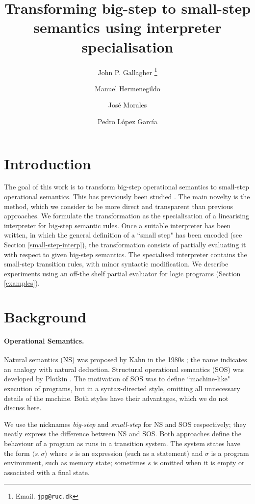 \documentclass{llncs}
\title{Transforming big-step to small-step semantics using interpreter specialisation}
\author{John P. Gallagher \thanks{Email. \texttt{jpg@ruc.dk}}\inst{1}\inst{2}
\and
Manuel Hermenegildo\inst{2}  \and Jos\'e Morales
\inst{2} \and Pedro L\'opez Garc\'ia\inst{2} 
}
\institute{Roskilde University, Denmark
\and
IMDEA Software Institute, Madrid, Spain}
\begin{document}
\maketitle


\pagestyle{plain}
\pagestyle{myheadings}

\section{Introduction}

The goal of this work is to transform big-step operational semantics to small-step operational semantics.
This has previously been studied \cite{VeselyF19,HuizingKK10,AmbalLSN22}.
The main novelty is the method, which we consider to be more
direct and transparent than previous approaches.  We formulate the transformation as the specialisation of a
linearising interpreter for big-step semantic rules.  Once a suitable interpreter has been written, in which the general
definition of a ``small step" has been encoded (see Section \ref{small-step-interp}), the transformation
consists of partially evaluating it with respect to given big-step semantics.  The specialised interpreter contains the 
small-step transition rules, 
with minor syntactic modification. We describe experiments using an off-the shelf partial evaluator 
for logic programs \cite{Logen} (Section \ref{examples}).
\section{Background}\label{background}

\paragraph{Operational Semantics.}
Natural semantics (NS) was proposed by Kahn in the 
1980s \cite{Kahn87}; the name indicates an analogy with natural deduction. 
Structural operational semantics (SOS) was developed by Plotkin \cite{Plotkin1981,Plotkin04,Plotkin04a}.  
The motivation of SOS was to define
``machine-like" execution of programs, but in a syntax-directed style, omitting all unnecessary details of
the machine.  Both styles have their advantages, which we do not discuss here.

We use the nicknames \emph{big-step} and \emph{small-step} for NS and SOS respectively;  they neatly
express the difference between NS and SOS.  Both approaches define the behaviour of a program
as runs in a transition system. The system states have the form $\langle s, \sigma\rangle$ where $s$ is an
expression (such as a statement) and $\sigma$ is a program environment, such as memory state; 
sometimes $s$ is omitted when it is empty
or associated with a final state.  
\end{document}
